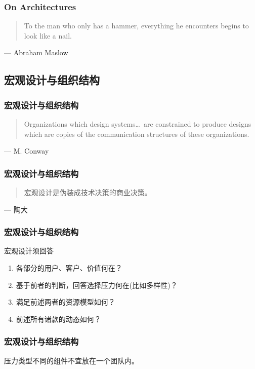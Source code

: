 \documentclass[UTF8,lualatex]{ctexbeamer}
\newcommand{\pagequote}[2]{
  \Large
  \begin{quotation}
      #1
  \end{quotation}
  \flushright\normalsize --- {#2}
}
\begin{document}
\begin{frame}
    \frametitle{On Architectures}
    \pagequote{To the man who only has a hammer, everything he encounters begins to look like a nail.}{Abraham Maslow}
\end{frame}


\subsection{宏观设计与组织结构}

\begin{frame}
    \frametitle{宏观设计与组织结构}
    \pagequote{
        Organizations which design systems\ldots~are constrained to produce designs
        which are copies of the communication structures of these organizations.}
        {M. Conway}
\end{frame}

\begin{frame}
    \frametitle{宏观设计与组织结构}
    \pagequote{宏观设计是伪装成技术决策的商业决策。}{陶大}
\end{frame}

\begin{frame}
    \frametitle{宏观设计与组织结构}
    \begin{block}{宏观设计须回答}
        \begin{enumerate}
            \item 各部分的用户、客户、价值何在？
            \item 基于前者的判断，回答选择压力何在(比如多样性)？
            \item 满足前述两者的资源模型如何？
            \item 前述所有诸款的动态如何？
        \end{enumerate}
    \end{block}
\end{frame}

\begin{frame}
    \frametitle{宏观设计与组织结构}
    \begin{corollary}
        压力类型不同的组件不宜放在一个团队内。
    \end{corollary}
\end{frame}
\end{document}
